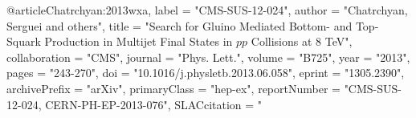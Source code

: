 @article{Chatrchyan:2013wxa,
      label          = "CMS-SUS-12-024",
      author         = "Chatrchyan, Serguei and others",
      title          = "{Search for Gluino Mediated Bottom- and Top-Squark
                        Production in Multijet Final States in $pp$ Collisions at
                        8 TeV}",
      collaboration  = "CMS",
      journal        = "Phys. Lett.",
      volume         = "B725",
      year           = "2013",
      pages          = "243-270",
      doi            = "10.1016/j.physletb.2013.06.058",
      eprint         = "1305.2390",
      archivePrefix  = "arXiv",
      primaryClass   = "hep-ex",
      reportNumber   = "CMS-SUS-12-024, CERN-PH-EP-2013-076",
      SLACcitation   = "%
}

